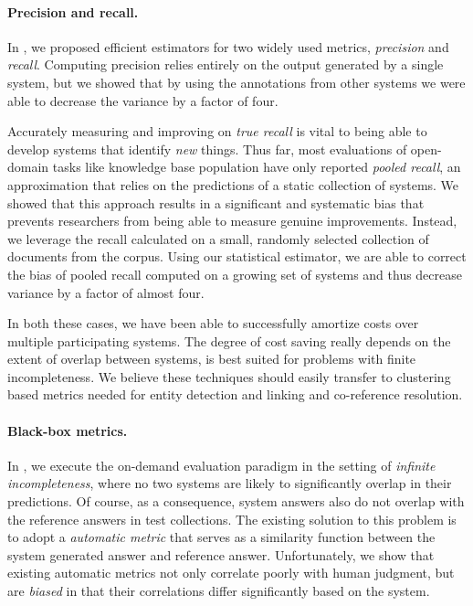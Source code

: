 \paragraph{Precision and recall.}
In , we proposed efficient estimators for two widely used metrics, \textit{precision} and \textit{recall}.
Computing precision relies entirely on the output generated by a single system, but we showed that by using the annotations from other systems we were able to decrease the variance by a factor of four.

Accurately measuring and improving on \textit{true recall} is vital to being able to develop systems that identify \textit{new} things.
Thus far, most evaluations of open-domain tasks like knowledge base population have only reported \textit{pooled recall}, an approximation that relies on the predictions of a static collection of systems.
We showed that this approach results in a significant and systematic bias that prevents researchers from being able to measure genuine improvements.  
Instead, we leverage the recall calculated on a small, randomly selected collection of documents from the corpus.
Using our statistical estimator, we are able to correct the bias of pooled recall computed on a growing set of systems and thus decrease variance by a factor of almost four.

In both these cases, we have been able to successfully amortize costs over multiple participating systems.
The degree of cost saving really depends on the extent of overlap between systems, is best suited for problems with finite incompleteness.
We believe these techniques should easily transfer to clustering based metrics needed for entity detection and linking and co-reference resolution.

\paragraph{Black-box metrics.}
In , we execute the on-demand evaluation paradigm in the setting of \textit{infinite incompleteness}, where no two systems are likely to significantly overlap in their predictions.
Of course, as a consequence, system answers also do not overlap with the reference answers in test collections.
The existing solution to this problem is to adopt a \textit{automatic metric} that serves as a similarity function between the system generated answer and reference answer.
Unfortunately, we show that existing automatic metrics not only correlate poorly with human judgment, but are \textit{biased} in that their correlations differ significantly based on the system.

